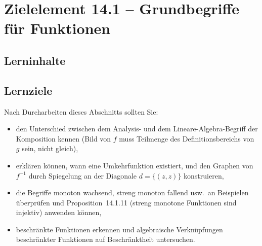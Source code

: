 \documentclass[a4paper,12pt]{article}
\begin{document}
\newpage

\section*{Zielelement 14.1 -- Grundbegriffe für Funktionen}

\subsection*{Lerninhalte}

\begin{center}
\end{center}

\subsection*{Lernziele}

Nach Durcharbeiten dieses Abschnitts sollten Sie:
\begin{itemize}
  \item den Unterschied zwischen dem Analysis- und dem Lineare-Algebra-Begriff
        der Komposition kennen (Bild von $f$ muss Teilmenge des Definitionsbereichs
        von $g$ sein, nicht gleich),
  \item erklären können, wann eine Umkehrfunktion existiert, und den Graphen von
        $f^{-1}$ durch Spiegelung an der Diagonale $d = \{(z,z)\}$ konstruieren,
  \item die Begriffe monoton wachsend, streng monoton fallend usw.\ an Beispielen
        überprüfen und Proposition~14.1.11 (streng monotone Funktionen sind injektiv)
        anwenden können,
  \item beschränkte Funktionen erkennen und algebraische Verknüpfungen beschränkter
        Funktionen auf Beschränktheit untersuchen.
\end{itemize}
\end{document}

